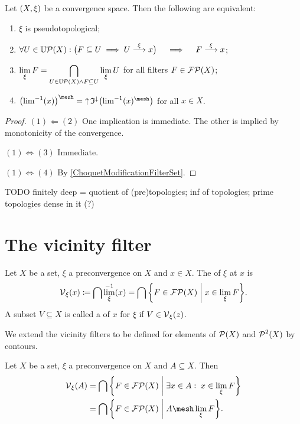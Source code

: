 \begin{lemma} \label{pseudotopologicalConditions}
Let $\left( X, \xi \right)$ be a convergence space. Then the following are equivalent:
\begin{enumerate}
\item $\xi$ is pseudotopological;
\item $\forall U\in \operatorname{\mathbb{U}\mathcal{P}}(X): \big( F\subseteq U \implies U \overset{\xi}{\longrightarrow} x\big) \quad\implies\quad F \overset{\xi}{\longrightarrow} x$;
\item $\displaystyle\lim_\xi F = \bigcap_{U\in \operatorname{\mathbb{U}\mathcal{P}}(X)\land F \subseteq U}\lim_\xi U$ for all filters $F\in \operatorname{\mathcal{FP}}(X)$;
\item $\big({\lim}^{-1}(x)\big)^\mesh = \upset\mathfrak{I}^{\imf}\big({\lim}^{-1}(x)^\mesh\big)$ for all $x\in X$.
\end{enumerate}
\end{lemma}
\begin{proof}
$(1) \Leftarrow (2)$ One implication is immediate. The other is implied by monotonicity of the convergence.

$(1)\Leftrightarrow (3)$ Immediate.

$(1)\Leftrightarrow (4)$ By \ref{ChoquetModificationFilterSet}.
\end{proof}

TODO finitely deep = quotient of (pre)topologies; inf of topologies; prime topologies dense in it (?)



\section{The vicinity filter}
\begin{definition}
Let $X$ be a set, $\xi$ a preconvergence on $X$ and $x\in X$. The  of $\xi$ at $x$ is
\[ \vicinity_\xi(x) \defeq \bigcap \lim_\xi^{-1}(x) = \bigcap \setbuilder{F\in \powerfilters(X)}{x\in \lim_\xi F}. \]
A subset $V\subseteq X$ is called a  of $x$ for $\xi$ if $V\in \operatorname{\mathcal{V}}_\xi(z)$.

We extend the vicinity filters to be defined for elements of $\operatorname{\mathcal{P}}(X)$ and $\operatorname{\mathcal{P}}^2(X)$ by contours.
\end{definition}

\begin{lemma}
Let $X$ be a set, $\xi$ a preconvergence on $X$ and $A\subseteq X$. Then
\begin{align*}
\vicinity_\xi(A) &= \bigcap \setbuilder{F\in \powerfilters(X)}{\exists x\in A: \; x\in \lim_\xi F} \\
&= \bigcap \setbuilder{F\in \powerfilters(X)}{A \mesh \lim_\xi F}.
\end{align*}
\end{lemma}

